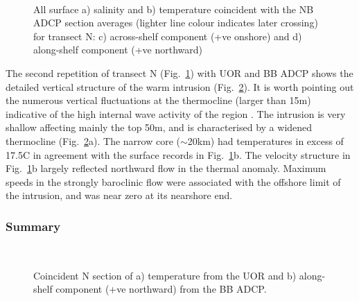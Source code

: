 \begin{figure}[t]
\arribacap \centering \hspace*{-0.3cm}%
\hspace*{0.2cm}
\hspace*{-0.7cm}\\
\hspace*{0.2cm}%
%
\caption{All surface a) salinity and b) temperature coincident
with the NB ADCP section averages (lighter line colour indicates
later crossing) for transect N: c) across-shelf component (+ve
onshore) and d) along-shelf component (+ve northward)}
\label{fig:thalADCP_N}
\end{figure}
The second repetition of transect N (Fig.~\ref{fig:thalADCP_N})
with UOR and BB ADCP shows the detailed vertical structure of the
warm intrusion (Fig.~\ref{fig:thalUOR_N}). It is worth pointing
out the numerous vertical fluctuations at the thermocline (larger
than 15m) indicative of the high internal wave activity of the
region \citep{Barton01}. The intrusion is very shallow affecting
mainly the top 50m, and is characterised by a widened thermocline
(Fig.~\ref{fig:thalUOR_N}a). The narrow core ($\sim$20km) had
temperatures in excess of 17.5\deg C in agreement with the surface
records in Fig.~\ref{fig:thalADCP_N}b. The velocity structure in
Fig.~\ref{fig:thalADCP_N}b largely reflected northward flow in the
thermal anomaly. Maximum speeds in the strongly baroclinic flow
were associated with the offshore limit of the intrusion, and was
near zero at its nearshore end.

\subsubsection{Summary}
\begin{figure}[t]
\arribacap \centering
{}\\
%
\caption{Coincident N section of a) temperature from the UOR and
b) along-shelf component (+ve northward) from the BB ADCP.}
\label{fig:thalUOR_N}
\end{figure}


